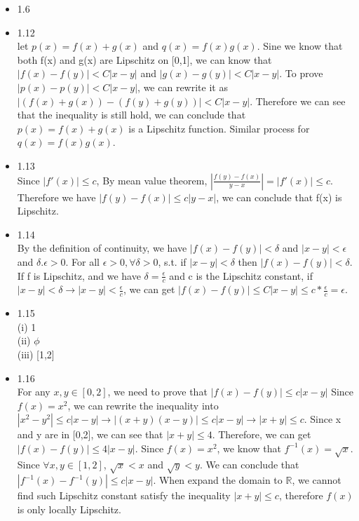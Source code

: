 \documentclass{article}
\begin{document}
\begin{itemize}
\item 1.6\\

\item 1.12\\
let $p(x) = f(x) + g(x)$ and $q(x) = f(x)g(x)$. Sine we know that both f(x) and g(x) are Lipschitz on [0,1], we can know that $|f(x) - f(y)| < C|x - y|$ and $|g(x) - g(y)| < C|x - y|$. To prove $|p(x) - p(y)| < C|x - y|$, we can rewrite it as $|(f(x)+g(x)) - (f(y)+g(y))| < C|x - y|$. Therefore we can see that the inequality is still hold, we can conclude that $p(x) = f(x) + g(x)$ is a Lipschitz function. Similar process for $q(x) = f(x)g(x)$. 
\item 1.13\\
Since $|f'(x)| \leq c$, By mean value theorem, $|\frac{f(y) - f(x)}{y - x}| = |f'(x)| \leq c$. Therefore we have $|f(y) - f(x)| \leq c|y-x|$, we can conclude that f(x) is Lipschitz.   
\item 1.14\\
By the definition of continuity, we have $
|f(x) - f(y)| < \delta$ and $|x-y| < \epsilon$ and $\delta.\epsilon > 0$. For all $\epsilon > 0, \forall \delta > 0$, s.t. if $|x - y| < \delta$ then $|f(x) - f(y)| < \delta$. If f is Lipschitz, and we have $\delta = \frac{\epsilon}{c}$ and c is the Lipschitz constant, if $|x-y|<\delta \rightarrow |x-y|<\frac{\epsilon}{c}$, we can get $|f(x) - f(y)| \leq C|x-y|\leq c*\frac{\epsilon}{c} = \epsilon$.
\item 1.15\\
(i) 1\\
(ii) $\phi$\\
(iii) [1,2]\\
\item 1.16\\
For any $x,y \in [0,2]$, we need to prove that $|f(x) - f(y)| \leq c|x - y|$ Since $f(x) = x^2$, we can rewrite the inequality into $|x^2 - y^2| \leq c|x - y| \rightarrow |(x+y)(x-y)| \leq c|x-y|\rightarrow|x+y| \leq c$. Since x and y are in [0,2], we can see that $|x + y| \leq 4$. Therefore, we can get $|f(x) - f(y)| \leq 4|x - y|$. Since $f(x) = x^2$, we know that $f^{-1}(x) = \sqrt{x}$. Since $\forall x,y \in [1,2]$, $\sqrt{x} < x$ and $\sqrt{y} < y$. We can conclude that $|f^{-1}(x) - f^{-1}(y)| \leq c|x-y|$. When expand the domain to $\mathbb{R}$, we cannot find such Lipschitz constant satisfy the inequality $|x+y| \leq c$, therefore $f(x)$ is only locally Lipschitz.\\


\end{itemize}
\end{document}
